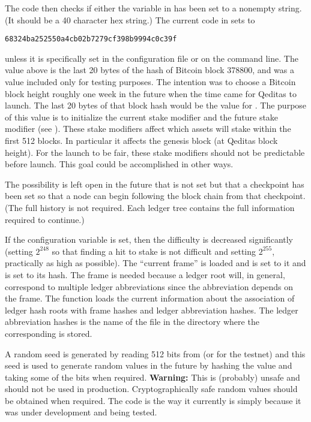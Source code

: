 The code then checks if either the {} variable in {}
has been set to a nonempty string. (It should be a 40 character hex string.)
The current code in {} sets {} to
\begin{verbatim}
68324ba252550a4cb02b7279cf398b9994c0c39f
\end{verbatim}
unless it is specifically set in the configuration file or on the command line.
The value above is the last 20 bytes of the hash of Bitcoin block 378800,
and was a value included only for testing purposes.
The intention was to choose a Bitcoin block height roughly one week in the future
when the time came for Qeditas to launch. The last 20 bytes of that block hash would
be the value for {}. The purpose of this value is to initialize the
current stake modifier and the future stake modifier (see {}).
These stake modifiers affect which assets will stake within the first 512 blocks.
In particular it affects the genesis block (at Qeditas block height).
For the launch to be fair, these stake modifiers should not be predictable before launch.
This goal could be accomplished in other ways.

The possibility is left open in the future that {} is not set but
that a checkpoint has been set so that a node can begin following the block chain
from that checkpoint. (The full history is not required. Each ledger tree contains
the full information required to continue.)

If the {} configuration variable is set, then the difficulty is decreased significantly
(setting {} $2^{248}$ so that finding a hit to stake is not difficult
and setting {} $2^{255}$, practically as high as possible).
The ``current frame'' is loaded 
and {} is set to it
and {} is set to its hash.
The frame is needed because a ledger root will, in general, correspond to multiple
ledger abbreviations since the abbreviation depends on the frame.
The function {}
loads the current information about the association of ledger hash roots with
frame hashes and ledger abbreviation hashes.
The ledger abbreviation hashes is the name of the file
in the {} directory
where the corresponding {} is stored.

A random seed is generated by reading 512 bits from {} (or {} for the testnet)
and this seed is used to generate random values in the future by hashing the value and taking
some of the bits when required.
{\bf{Warning:}} This is (probably) unsafe and should not be used in production.
Cryptographically safe random values should be obtained when required.
The code is the way it currently is simply because it was under development and
being tested.

